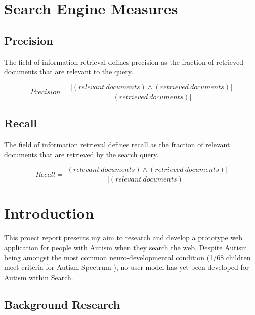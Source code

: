 \documentclass[a4paper, 11pt]{article}
\begin{document}
\section*{Search Engine Measures}
\newcommand{\cfplus}{\mathbin{\genfrac{}{}{0pt}{}{}{+}}}

\subsection*{Precision}
The field of information retrieval defines precision as the fraction of retrieved documents that are relevant to the query. 

\begin{equation*}
Precision
=\frac{|(relevant\ documents) \land (retrieved\ documents)|}{|(retrieved\ documents)|}
\end{equation*}

\subsection*{Recall}
The field of information retrieval defines recall as the fraction of relevant documents that are retrieved by the search query. 

\begin{equation*}
Recall
=\frac{|(relevant\ documents) \land (retrieved\ documents)|}{|(relevant\ documents)|}
\end{equation*}
\clearpage

\section{Introduction}\label{intro}

This proect report presents my aim to research and develop a prototype web application for people with Autism when they search the web. Despite Autism being amongst the most common neuro-developmental condition (1/68 children meet criteria for Autism Spectrum \cite{CDC}), no user model has yet been developed for Autism within Search. 

\subsection {Background Research}\label{background} 
\end{document}
